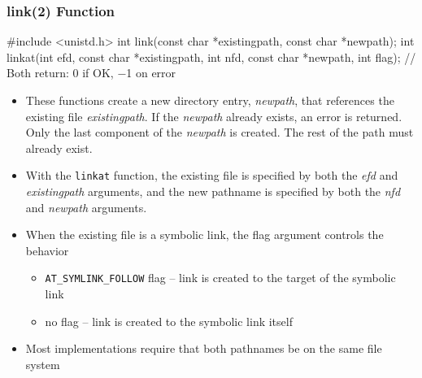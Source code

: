 \documentclass[newPxFont,sthlmFooter,nooffset]{beamer}
\begin{document}
\begin{frame}[containsverbatim,t]
  \frametitle{link(2) Function}
\begin{codedef}
#include <unistd.h>
int link(const char *existingpath, const char *newpath);
int linkat(int efd, const char *existingpath, int nfd, const char *newpath, int flag);
// Both return: 0 if OK, −1 on error
\end{codedef}

{\footnotesize
\begin{itemize}
\item These functions create a new directory entry, \textit{newpath},
  that references the existing file \textit{existingpath}. If the
  \textit{newpath} already exists, an error is returned. Only the last
  component of the \textit{newpath} is created. The rest of the path
  must already exist.
\item With the \texttt{linkat} function, the existing file is specified by
  both the \textit{efd} and \textit{existingpath} arguments, and the
  new pathname is specified by both the \textit{nfd} and
  \textit{newpath} arguments.
\item When the existing file is a symbolic link, the flag argument controls the behavior
  \begin{itemize}
  \item \texttt{AT\_SYMLINK\_FOLLOW} flag -- link is created to the target of the symbolic link
  \item no flag -- link is created to the symbolic link itself
  \end{itemize}
  \item  Most implementations require that both pathnames be on the same file system
\end{itemize}
}

\end{frame}
\end{document}
